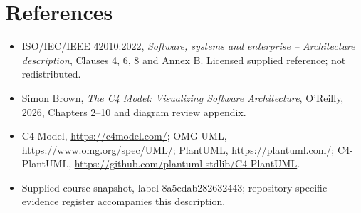 \documentclass[10pt,letterpaper]{article}
\begin{document}
\section{References}
\begin{itemize}
\item ISO/IEC/IEEE 42010:2022, \emph{Software, systems and enterprise -- Architecture description}, Clauses 4, 6, 8 and Annex B. Licensed supplied reference; not redistributed.
\item Simon Brown, \emph{The C4 Model: Visualizing Software Architecture}, O'Reilly, 2026, Chapters 2--10 and diagram review appendix.
\item C4 Model, \url{https://c4model.com/}; OMG UML, \url{https://www.omg.org/spec/UML/}; PlantUML, \url{https://plantuml.com/}; C4-PlantUML, \url{https://github.com/plantuml-stdlib/C4-PlantUML}.
\item Supplied course snapshot, label 8a5edab282632443; repository-specific evidence register accompanies this description.
\end{itemize}
\end{document}
